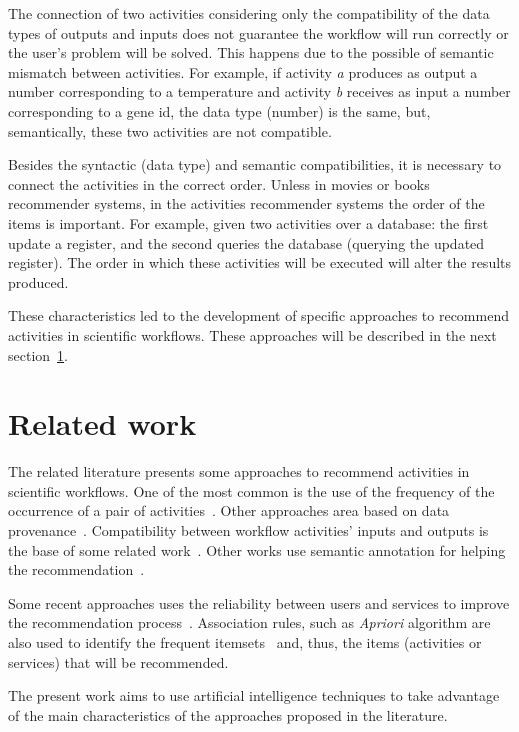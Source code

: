\documentclass{sig-alternate-05-2015}
\begin{document}
The connection of two activities considering only the compatibility of the data types of outputs and inputs does not guarantee the workflow will run correctly or the user's problem will be solved. This happens due to the possible of semantic mismatch between activities. For example, if activity \emph{a} produces as output a number corresponding to a temperature and activity \emph{b} receives as input a number corresponding to a gene id, the data type (number) is the same, but, semantically, these two activities are not compatible.

Besides the syntactic (data type) and semantic compatibilities, it is necessary to connect the activities in the correct order. Unless in movies or books recommender systems, in the activities recommender systems the order of the items is important. For example, given two activities over a database: the first update a register, and the second queries the database (querying the updated register). The order in which these activities will be executed will alter the results produced.

These characteristics led to the development of specific approaches to recommend activities in scientific workflows. These approaches will be described in the next section~\ref{CORRELATOS}.


\section{Related work}\label{CORRELATOS}
The related literature presents some approaches to recommend activities in scientific workflows. One of the most common is the use of the frequency of the occurrence of a pair of activities~\cite{TELEA13, VINCA4Science07, Grafo12, diamantini_mining_2012, Zhang2011, Zhang2014}.
Other approaches area based on data provenance~\cite{Shao2007, Shao2009, OLIVEIRA2008, Koop2008, Garijo2013, Yeo2013}. Compatibility between workflow activities' inputs and outputs is the base of some related work~\cite{Zhang35, Ayadi2007, Zhang2006}. Other works use semantic annotation for helping the recommendation~\cite{Oliveira2009, Zhang2013}.

Some recent approaches uses the reliability between users and services to improve the recommendation process~\cite{ReputationNet22}. Association rules, such as  \emph{Apriori} algorithm are also used to identify the frequent itemsets~\cite{Tan2011, Wang2009} and, thus, the items (activities or services) that will be recommended.

The present work aims to use artificial intelligence techniques to take advantage of the main characteristics of the approaches proposed in the literature.
\end{document}
